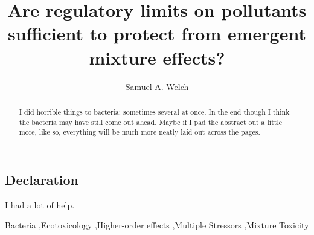 \documentclass[final,1p,times]{elsarticle}
\begin{document}
\begin{frontmatter}


\section{Declaration}

I had a lot of help.

\newpage

\title{Are regulatory limits on pollutants sufficient to protect from emergent mixture effects?}


\author{Samuel A. Welch}

\address{Silwood Park, Imperial College London, United Kingdom}

\begin{abstract}
I did horrible things to bacteria; sometimes several at once. In the end though I think the bacteria may have still come out ahead. Maybe if I pad the abstract out a little more, like so, everything will be much more neatly laid out across the pages. 
\end{abstract}

\begin{keyword}
Bacteria \sep Ecotoxicology \sep Higher-order effects \sep Multiple Stressors \sep Mixture Toxicity


\end{keyword}

\end{frontmatter}
\end{document}
